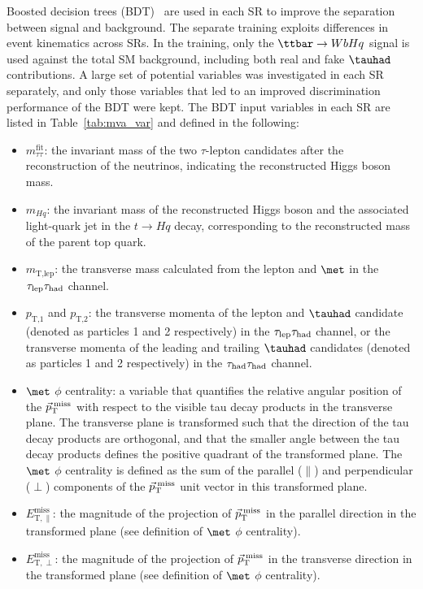 Boosted decision trees (BDT)~\cite{Breiman:1984jka,Friedman:2002we,Freund:1997xna} are used in each SR to improve the separation between signal and background. The separate training exploits differences in event kinematics across SRs.  In the training, only the $\Hq$ signal is used against the total SM background, including both real and fake $\tauhad$ contributions.
A large set of potential variables was investigated in each SR separately, and only those variables that led to an improved discrimination
performance of the BDT were kept.  The BDT input variables in each SR are listed in Table~\ref{tab:mva_var} and defined in the following:

\begin{itemize}
\item $m_{\tau\tau}^{\text{fit}}$: the invariant mass of the two $\tau$-lepton candidates after the reconstruction of the neutrinos, indicating the reconstructed Higgs boson mass.
\item $m_{Hq}$: the invariant mass of the reconstructed Higgs boson and the associated light-quark jet in the $t \to Hq$ decay, corresponding to the reconstructed mass of the parent top quark.
\item $m_{\text{T,lep}}$: the transverse mass calculated from the lepton and $\met$ in the $\tau_{\mathrm{lep}} \tau_{\mathrm{had}}$ channel.
\item $p_{\text{T,1}}$ and $p_{\text{T,2}}$:  the transverse momenta of the lepton and $\tauhad$ candidate (denoted as particles 1 and 2 respectively) in the $\tau_{\mathrm{lep}} \tau_{\mathrm{had}}$ channel, or the transverse momenta of the leading and trailing $\tauhad$ candidates (denoted as particles 1 and 2 respectively) in the $\tau_{\mathrm{had}} \tau_{\mathrm{had}}$ channel.
\item $\met$ $\phi$ centrality: a variable that quantifies the relative angular position of the $\vec{p}_\textrm{T}^\textrm{\;miss}$ with respect to the 
visible tau decay products in the transverse plane. The transverse plane is transformed such that the direction of the tau decay products are 
orthogonal, and that the smaller angle between the tau decay products defines the positive quadrant of the transformed plane. 
The $\met$ $\phi$ centrality is defined as the sum of the parallel ($\parallel$) and perpendicular ($\perp$) components of the $\vec{p}_\textrm{T}^\textrm{\;miss}$ unit vector in this transformed plane.
\item $E_{\text{T},\parallel}^{\text{miss}}$: the magnitude of the projection of $\vec{p}_\textrm{T}^\textrm{\;miss}$ in the parallel direction in the transformed plane (see definition of $\met$ $\phi$ centrality).
\item $E_{\text{T},\perp}^{\text{miss}}$: the magnitude of the projection of $\vec{p}_\textrm{T}^\textrm{\;miss}$ in the transverse direction in the transformed plane (see definition of $\met$ $\phi$ centrality).

\end{itemize}
